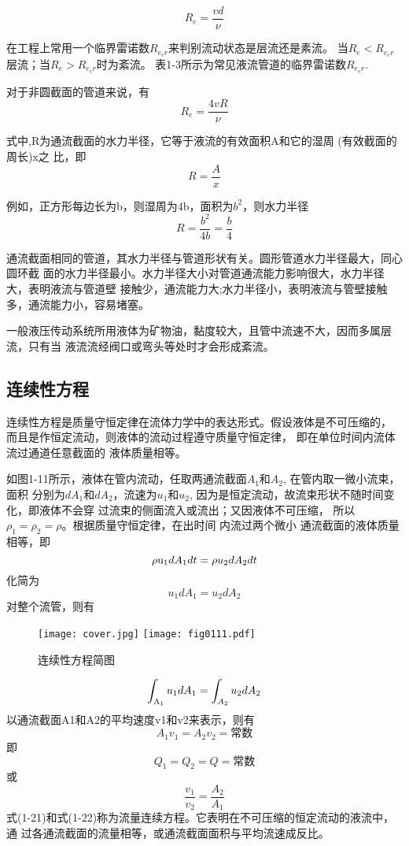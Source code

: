 
$$ R_{e}=\frac{vd}{\nu } $$

在工程上常用一个临界雷诺数$R_{e_cr}$来判别流动状态是层流还是素流。
当$R_{e}<R_{e_cr}$ 层流；当$R_{e} > R_{e_cr}$时为紊流。
表1-3所示为常见液流管道的临界雷诺数$R_{e_cr}$.


对于非圆截面的管道来说，有
$$R_{e}=\frac{4vR}{\nu }$$

式中,R为通流截面的水力半径，它等于液流的有效面积A和它的湿周
(有效截面的周长)x之
比，即
$$R=\frac{A}{x}$$

例如，正方形每边长为b，则湿周为4b，面积为$b^2$，则水力半径
$$R=\frac{b^2}{4b}=\frac{b}{4}$$

通流截面相同的管道，其水力半径与管道形状有关。圆形管道水力半径最大，同心圆环截 面的水力半径最小。水力半径大小对管道通流能力影响很大，水力半径大，表明液流与管道壁 接触少，通流能力大;水力半径小，表明液流与管壁接触多，通流能力小，容易堵塞。

一般液压传动系统所用液体为矿物油，黏度较大，且管中流速不大，因而多属层流，只有当 液流流经阀口或弯头等处时才会形成紊流。

\subsection{连续性方程}

连续性方程是质量守恒定律在流体力学中的表达形式。假设液体是不可压缩的，
而且是作恒定流动，则液体的流动过程遵守质量守恒定律，
即在单位时间内流体流过通道任意截面的 液体质量相等。

如图1-11所示，液体在管内流动，任取两通流截面$A_1$和$A_2$,
在管内取一微小流束，面积 分别为$dA_1$和$dA_2$，流速为$u_1$和$u_2$,
因为是恒定流动，故流束形状不随时间变化，即液体不会穿 
过流束的侧面流入或流出；又因液体不可压缩，
所以$\rho_1=\rho_2=\rho$。根据质量守恒定律，在出时间 内流过两个微小
通流截面的液体质量相等，即
\[\rho {{\rm{u}}_1}d{A_1}dt = \rho {u_2}d{A_2}dt\]
化简为
\[{u_1}d{A_1} = {u_2}d{A_2}\]
对整个流管，则有

\begin{figure}
  \centering
  \ifOpenSource
  \texttt{[image: cover.jpg]}
  \else
  \texttt{[image: fig0111.pdf]}%
  \fi
  \caption{连续性方程简图}
  \label{fig:0111}%
  \end{figure}


\[\int_{{{\rm{A}}_1}} {{u_1}d{A_1}}  = \int_{{A_2}} {{u_2}d{A_2}} \]
以通流截面A1和A2的平均速度v1和v2来表示，则有
$${A_1}{v_1} = {A_2}{v_2} =\text{常数}$$ 
即
$${Q_1} = {Q_2} = Q =\text{常数}$$ 
或
\[\frac{{{v_1}}}{{{v_2}}} = \frac{{{A_2}}}{{{A_1}}}\]
式(1-21)和式(1-22)称为流量连续方程。它表明在不可压缩的恒定流动的液流中，通 过各通流截面的流量相等，或通流截面面积与平均流速成反比。

